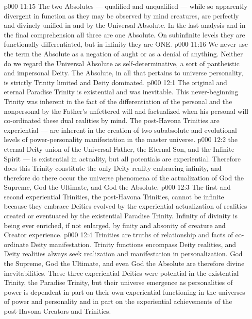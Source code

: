 \vs p000 11:15 \pc {} The two Absolutes --- qualified and unqualified --- while so apparently divergent in function as they may be observed by mind creatures, are perfectly and divinely unified in and by the Universal Absolute. In the last analysis and in the final comprehension all three are one Absolute. On subinfinite levels they are functionally differentiated, but in infinity they are ONE.
\vs p000 11:16 \pc We never use the term the Absolute as a negation of aught or as a denial of anything. Neither do we regard the Universal Absolute as self\hyp{}determinative, a sort of pantheistic and impersonal Deity. The Absolute, in all that pertains to universe personality, is strictly Trinity limited and Deity dominated.
\vs p000 12:1 The original and eternal Paradise Trinity is existential and was inevitable. This never\hyp{}beginning Trinity was inherent in the fact of the differentiation of the personal and the nonpersonal by the Father’s unfettered will and factualized when his personal will co\hyp{}ordinated these dual realities by mind. The post\hyp{}Havona Trinities are experiential --- are inherent in the creation of two subabsolute and evolutional levels of power\hyp{}personality manifestation in the master universe.
\vs p000 12:2 \pc {} the eternal Deity union of the Universal Father, the Eternal Son, and the Infinite Spirit --- is existential in actuality, but all potentials are experiential. Therefore does this Trinity constitute the only Deity reality embracing infinity, and therefore do there occur the universe phenomena of the actualization of God the Supreme, God the Ultimate, and God the Absolute.
\vs p000 12:3 \pc The first and second experiential Trinities, the post\hyp{}Havona Trinities, cannot be infinite because they embrace  Deities evolved by the experiential actualization of realities created or eventuated by the existential Paradise Trinity. Infinity of divinity is being ever enriched, if not enlarged, by finity and absonity of creature and Creator experience.
\vs p000 12:4 Trinities are truths of relationship and facts of co\hyp{}ordinate Deity manifestation. Trinity functions encompass Deity realities, and Deity realities always seek realization and manifestation in personalization. God the Supreme, God the Ultimate, and even God the Absolute are therefore divine inevitabilities. These three experiential Deities were potential in the existential Trinity, the Paradise Trinity, but their universe emergence as personalities of power is dependent in part on their own experiential functioning in the universes of power and personality and in part on the experiential achievements of the post\hyp{}Havona Creators and Trinities.
